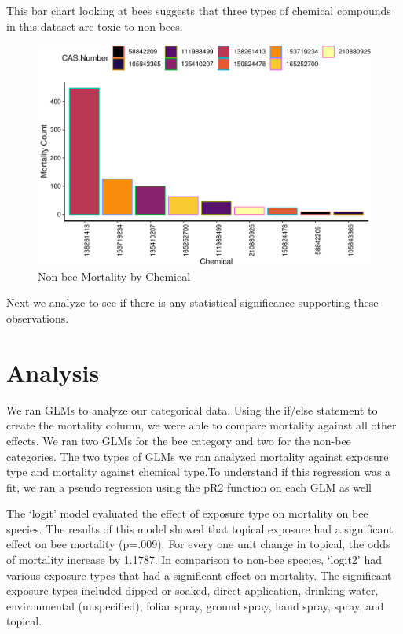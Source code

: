 \documentclass[
  12pt,
]{article}
\begin{document}
\newpage

This bar chart looking at bees suggests that three types of chemical
compounds in this dataset are toxic to non-bees.

\begin{figure}
\centering
\includegraphics{UpdatedwithModel_files/figure-latex/non bee chemical-1.pdf}
\caption{Non-bee Mortality by Chemical}
\end{figure}

Next we analyze to see if there is any statistical significance
supporting these observations. \newpage

\hypertarget{analysis}{%
\section{Analysis}\label{analysis}}

We ran GLMs to analyze our categorical data. Using the if/else statement
to create the mortality column, we were able to compare mortality
against all other effects. We ran two GLMs for the bee category and two
for the non-bee categories. The two types of GLMs we ran analyzed
mortality against exposure type and mortality against chemical type.To
understand if this regression was a fit, we ran a pseudo regression
using the pR2 function on each GLM as well

The `logit' model evaluated the effect of exposure type on mortality on
bee species. The results of this model showed that topical exposure had
a significant effect on bee mortality (p=.009). For every one unit
change in topical, the odds of mortality increase by 1.1787. In
comparison to non-bee species, `logit2' had various exposure types that
had a significant effect on mortality. The significant exposure types
included dipped or soaked, direct application, drinking water,
environmental (unspecified), foliar spray, ground spray, hand spray,
spray, and topical.
\end{document}
